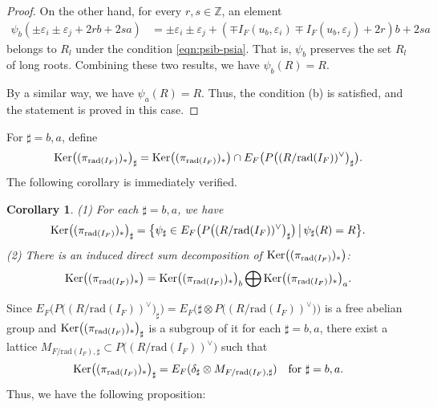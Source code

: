 \documentclass[11pt]{amsart}
\newtheorem{cor}[thm]{Corollary}%
\begin{document}
{\begin{proof}
On the other hand, for every $r,s\in\mathbb{Z}$, an element
\begin{align*}
\psi_b(\pm\varepsilon_i\pm\varepsilon_j+2rb+2sa)&=
\pm \varepsilon_i\pm\varepsilon_j
+(\mp I_F(u_b,\varepsilon_i)\mp I_F(u_b,\varepsilon_j)+2r)b+2sa
\end{align*}
belongs to $R_l$ under the condition \eqref{eqn:psib-psia}. That is,  
$\psi_b$ preserves the set $R_l$ of long roots. Combining these two results, 
we have $\psi_b(R)=R$.  

By a similar way, we have $\psi_a(R)=R$. Thus, the condition (b) is satisfied, and 
the statement is proved in this case. 
\end{proof}

For $\sharp=b,a$, define
\[\mbox{\rm Ker}\bigl((\pi_{\mathrm{rad}(I_F)})_*\bigr)_\sharp
=\mbox{\rm Ker}\bigl((\pi_{\mathrm{rad}(I_F)})_*\bigr)\cap
E_F\bigl(P\big((R/\mathrm{rad}(I_F))^\vee\big)_{\sharp}\bigr).\]
The following corollary is immediately verified. 

\begin{cor}\label{cor:ker3}
{\rm (1)} For each $\sharp=b,a$, we have
\begin{equation*}\label{eqn:(B.2.4)}
\mbox{\rm Ker}\bigl((\pi_{\mathrm{rad}(I_F)})_*\bigr)_\sharp=
\bigl\{\psi_\sharp\in E_F\bigl(P\big((R/\mathrm{rad}(I_F))^\vee\big)_{\sharp}\bigr)\,\bigl|\,
\psi_\sharp(R)=R\bigr\}.
\end{equation*}
{\rm (2)} There is an induced direct sum decomposition of 
$\mbox{\rm Ker}\bigl((\pi_{\mathrm{rad}(I_F)})_*\bigr)${\rm :}
$$\mbox{\rm Ker}\bigl((\pi_{\mathrm{rad}(I_F)})_*\bigr)
=\mbox{\rm Ker}\bigl((\pi_{\mathrm{rad}(I_F)})_*\bigr)_b\bigoplus
\mbox{\rm Ker}\bigl((\pi_{\mathrm{rad}(I_F)})_*\bigr)_a.$$
\end{cor}
\vskip 3mm

Since $E_F\big(P\big((R/\mathrm{rad}(I_F))^\vee\big)_{\sharp}\big)
=E_F\big(\sharp\otimes P\big((R/\mathrm{rad}(I_F))^\vee\big)\big)$ is a free abelian 
group and $\mbox{\rm Ker}\bigl((\pi_{\mathrm{rad}(I_F)})_*\bigr)_\sharp$ is a 
subgroup of it for each $\sharp=b,a$, there exist a lattice 
$M_{F/\mathrm{rad}(I_F),\sharp}\subset P\big((R/\mathrm{rad}(I_F))^\vee\big)$ 
such that
\begin{equation*}\label{eqn:def-M}
\mbox{\rm Ker}\bigl((\pi_{\mathrm{rad}(I_F)})_*\bigr)_\sharp
=E_F(\delta_{\sharp}\otimes
M_{F/\mathrm{rad}(I_F),\sharp})\quad\mbox{for }\sharp=b,a.
\end{equation*}
Thus, we have the following proposition:

}
\end{document}
